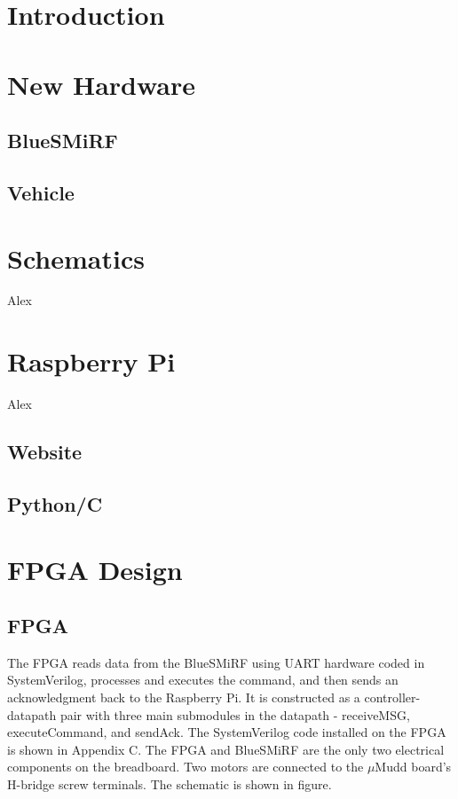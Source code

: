 \documentclass[12pt]{article}
\begin{document}
\newpage


\section{Introduction}
\section{New Hardware}
\subsection{BlueSMiRF}
\subsection{Vehicle}
\section{Schematics}
Alex
\section{Raspberry Pi}
Alex
\subsection{Website}
\subsection{Python/C}
\section{FPGA Design}
\subsection{FPGA}
The FPGA reads data from the BlueSMiRF using UART hardware coded in SystemVerilog, processes and executes the command, and then sends an acknowledgment back to the Raspberry Pi.  It is constructed as a controller-datapath pair with three main submodules in the datapath - receiveMSG, executeCommand, and sendAck.  The SystemVerilog code installed on the FPGA is shown in Appendix C. The FPGA and BlueSMiRF are the only two electrical components on the breadboard. Two motors are connected to the $\mu$Mudd board's H-bridge screw terminals.  The schematic is shown in figure.
\end{document}
